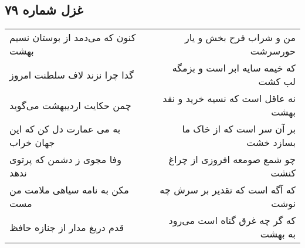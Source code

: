 \begin{center}
\section*{غزل شماره ۷۹}
\label{sec:sh079}
\begin{longtable}{l p{0.5cm} r}
کنون که می‌دمد از بوستان نسیم بهشت
&&
من و شراب فرح بخش و یار حورسرشت
\\
گدا چرا نزند لاف سلطنت امروز
&&
که خیمه سایه ابر است و بزمگه لب کشت
\\
چمن حکایت اردیبهشت می‌گوید
&&
نه عاقل است که نسیه خرید و نقد بهشت
\\
به می عمارت دل کن که این جهان خراب
&&
بر آن سر است که از خاک ما بسازد خشت
\\
وفا مجوی ز دشمن که پرتوی ندهد
&&
چو شمع صومعه افروزی از چراغ کنشت
\\
مکن به نامه سیاهی ملامت من مست
&&
که آگه است که تقدیر بر سرش چه نوشت
\\
قدم دریغ مدار از جنازه حافظ
&&
که گر چه غرق گناه است می‌رود به بهشت
\\
\end{longtable}
\end{center}
